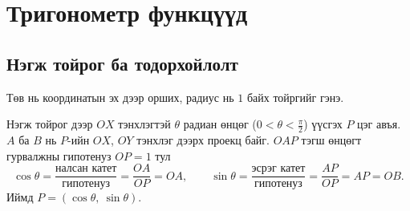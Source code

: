 \providecommand{\R}{\mathbb{R}}
\providecommand{\N}{\mathbb{N}}
\providecommand{\tg}{\operatorname{tg}}
\providecommand{\ctg}{\operatorname{ctg}}
\providecommand{\arctg}{\operatorname{arctg}}
\providecommand{\arcctg}{\operatorname{arcctg}}


\section{Тригонометр функцүүд}

\subsection{Нэгж тойрог ба тодорхойлолт}
\begin{definition}
Төв нь координатын эх дээр орших, радиус нь $1$ байх тойргийг  гэнэ.
\end{definition}

Нэгж тойрог дээр $OX$ тэнхлэгтэй $\theta$ радиан өнцөг ($0<\theta<\frac{\pi}{2}$) үүсгэх
$P$ цэг авъя. $A$ ба $B$ нь $P$-ийн $OX$, $OY$ тэнхлэг дээрх проекц байг.
$OAP$ тэгш өнцөгт гурвалжны гипотенуз $OP=1$ тул
\[
\cos\theta=\frac{\text{налсан катет}}{\text{гипотенуз}}=\frac{OA}{OP}=OA,
\qquad
\sin\theta=\frac{\text{эсрэг катет}}{\text{гипотенуз}}=\frac{AP}{OP}=AP=OB.
\]
Иймд $P=(\cos\theta,\ \sin\theta)$.

